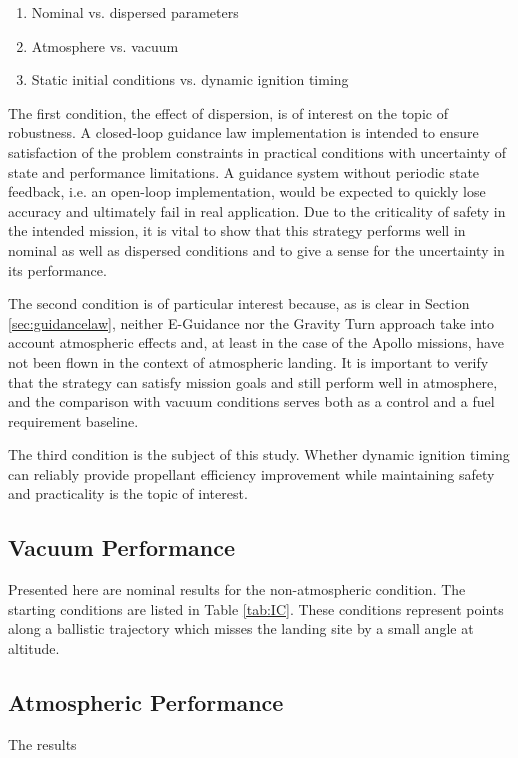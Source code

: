 \begin{enumerate}
	\item Nominal vs. dispersed parameters
	\item Atmosphere vs. vacuum
	\item Static initial conditions vs. dynamic ignition timing
\end{enumerate}

The first condition, the effect of dispersion, is of interest on the topic of robustness. A closed-loop guidance law implementation is intended to ensure satisfaction of the problem constraints in practical conditions with uncertainty of state and performance limitations. A guidance system without periodic state feedback, i.e. an open-loop implementation, would be expected to quickly lose accuracy and ultimately fail in real application. Due to the criticality of safety in the intended mission, it is vital to show that this strategy performs well in nominal as well as dispersed conditions and to give a sense for the uncertainty in its performance.

The second condition is of particular interest because, as is clear in Section \ref{sec:guidancelaw}, neither E-Guidance nor the Gravity Turn approach take into account atmospheric effects and, at least in the case of the Apollo missions, have not been flown in the context of atmospheric landing. It is important to verify that the strategy can satisfy mission goals and still perform well in atmosphere, and the comparison with vacuum conditions serves both as a control and a fuel requirement baseline. 

The third condition is the subject of this study. Whether dynamic ignition timing can reliably provide propellant efficiency improvement while maintaining safety and practicality is the topic of interest.

\subsection{Vacuum Performance}
Presented here are nominal results for the non-atmospheric condition. The starting conditions are listed in Table \ref{tab:IC}. These conditions represent points along a ballistic trajectory which misses the landing site by a small angle at altitude. 

\subsection{Atmospheric Performance} \label{sec:results_atmosphere}
The results 

